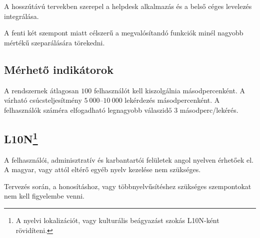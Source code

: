 A hosszútávú tervekben szerepel a \foreignlanguage{british}{helpdesk} alkalmazás és a belső céges levelezés integrálása.

A fenti két szempont miatt célszerű a megvalósítandó funkciók minél nagyobb mértékű szeparálására törekedni.


\subsection{Mérhető indikátorok}\label{sec:indikatorok}
A rendszernek átlagosan $100$ felhasználót kell kiszolgálnia másodpercenként. A várható csúcsteljesítmény $5~000$--$10~000$ lekérdezés másodpercenként. A felhasználók száméra elfogadható legnagyobb válaszidő 3 másodperc/lekérés.


\subsection[L10N]{L10N\footnote{A nyelvi lokalizációt, vagy kulturális beágyazást szokás L10N-ként rövidíteni.}}
A felhasználói, adminisztratív és karbantartói felületek angol nyelven érhetőek el. A magyar, vagy attól eltérő egyéb nyelv kezelése nem szükséges.

Tervezés során, a honosításhoz, vagy többnyelvűsítéshez szükséges szempontokat nem kell figyelembe venni.
